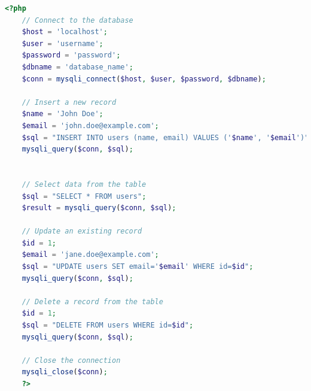 \documentclass[11pt]{article}
\begin{document}
\begin{lstlisting}[language=php]
    <?php
    // Connect to the database
    $host = 'localhost';
    $user = 'username';
    $password = 'password';
    $dbname = 'database_name';
    $conn = mysqli_connect($host, $user, $password, $dbname);

    // Insert a new record
    $name = 'John Doe';
    $email = 'john.doe@example.com';
    $sql = "INSERT INTO users (name, email) VALUES ('$name', '$email')";
    mysqli_query($conn, $sql);


    // Select data from the table
    $sql = "SELECT * FROM users";
    $result = mysqli_query($conn, $sql);

    // Update an existing record
    $id = 1;
    $email = 'jane.doe@example.com';
    $sql = "UPDATE users SET email='$email' WHERE id=$id";
    mysqli_query($conn, $sql);

    // Delete a record from the table
    $id = 1;
    $sql = "DELETE FROM users WHERE id=$id";
    mysqli_query($conn, $sql);

    // Close the connection
    mysqli_close($conn);
    ?>

\end{lstlisting}


\end{document}
